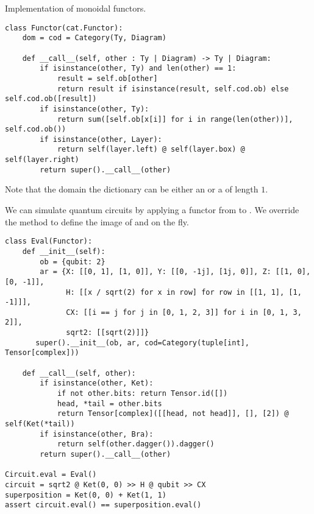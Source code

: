 \begin{python}
{\normalfont Implementation of monoidal functors.}
\begin{verbatim}
class Functor(cat.Functor):
    dom = cod = Category(Ty, Diagram)

    def __call__(self, other : Ty | Diagram) -> Ty | Diagram:
        if isinstance(other, Ty) and len(other) == 1:
            result = self.ob[other]
            return result if isinstance(result, self.cod.ob) else self.cod.ob([result])
        if isinstance(other, Ty):
            return sum([self.ob[x[i]] for i in range(len(other))], self.cod.ob())
        if isinstance(other, Layer):
            return self(layer.left) @ self(layer.box) @ self(layer.right)
        return super().__call__(other)
\end{verbatim}

Note that the domain the dictionary  can be either an  or a  of length $1$.
\end{python}

\begin{example}
We can simulate quantum circuits by applying a functor from  to .
We override the  method to define the image of  and  on the fly.

\begin{verbatim}
class Eval(Functor):
    def __init__(self):
        ob = {qubit: 2}
        ar = {X: [[0, 1], [1, 0]], Y: [[0, -1j], [1j, 0]], Z: [[1, 0], [0, -1]],
              H: [[x / sqrt(2) for x in row] for row in [[1, 1], [1, -1]]],
              CX: [[i == j for j in [0, 1, 2, 3]] for i in [0, 1, 3, 2]],
              sqrt2: [[sqrt(2)]]}
       super().__init__(ob, ar, cod=Category(tuple[int], Tensor[complex]))

    def __call__(self, other):
        if isinstance(other, Ket):
            if not other.bits: return Tensor.id([])
            head, *tail = other.bits
            return Tensor[complex]([[head, not head]], [], [2]) @ self(Ket(*tail))
        if isinstance(other, Bra):
            return self(other.dagger()).dagger()
        return super().__call__(other)

Circuit.eval = Eval()
circuit = sqrt2 @ Ket(0, 0) >> H @ qubit >> CX
superposition = Ket(0, 0) + Ket(1, 1)
assert circuit.eval() == superposition.eval()
\end{verbatim}
\end{example}

